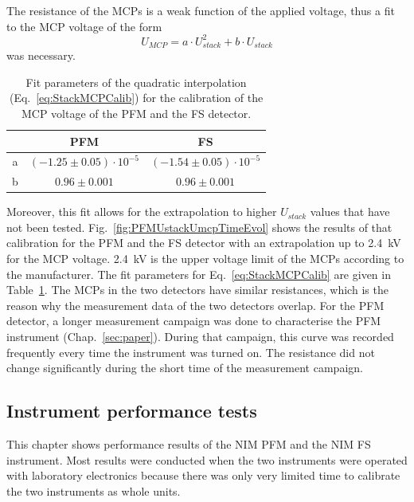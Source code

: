 	The resistance of the MCPs is a weak function of the applied voltage, thus a fit to the MCP voltage of the form
	\begin{equation}
		U_{MCP} = a\cdot U_{stack}^2 + b\cdot U_{stack}
		\label{eq:StackMCPCalib}
	\end{equation}
	was necessary.
	\begin{table}[h!] %
		\begin{center}
			\begin{tabular}{c|c|c|}
				& PFM	& FS\\ \hline
				a	& $(-1.25 \pm 0.05)\cdot10^{-5}$ & $(-1.54 \pm 0.05)\cdot10^{-5}$ \\
				b 	& $0.96 \pm 0.001$	& $0.96 \pm 0.001$\\
			\end{tabular}
		\end{center}
		\caption{Fit parameters of the quadratic interpolation (Eq.~\eqref{eq:StackMCPCalib}) for the calibration of the MCP voltage of the PFM and the FS detector.}
		\label{tab:UstackUmcpFitParams}
	\end{table}
	Moreover, this fit allows for the extrapolation to higher $U_{stack}$ values that have not been tested. Fig.~\ref{fig:PFMUstackUmcpTimeEvol} shows the results of that calibration for the PFM and the FS detector with an extrapolation up to 2.4~kV for the MCP voltage. 2.4~kV is the upper voltage limit of the MCPs according to the manufacturer. The fit parameters for Eq.~\eqref{eq:StackMCPCalib} are given in Table~\ref{tab:UstackUmcpFitParams}. The MCPs in the two detectors have similar resistances, which is the reason why the measurement data of the two detectors overlap. For the PFM detector, a longer measurement campaign was done to characterise the PFM instrument (Chap.~\ref{sec:paper}). During that campaign, this curve was recorded frequently every time the instrument was turned on. The resistance did not change significantly during the short time of the measurement campaign.
	
	

		
	\subsection{Instrument performance tests}
		This chapter shows performance results of the NIM PFM and the NIM FS instrument. Most results were conducted when the two instruments were operated with laboratory electronics because there was only very limited time to calibrate the two instruments as whole units.
		

